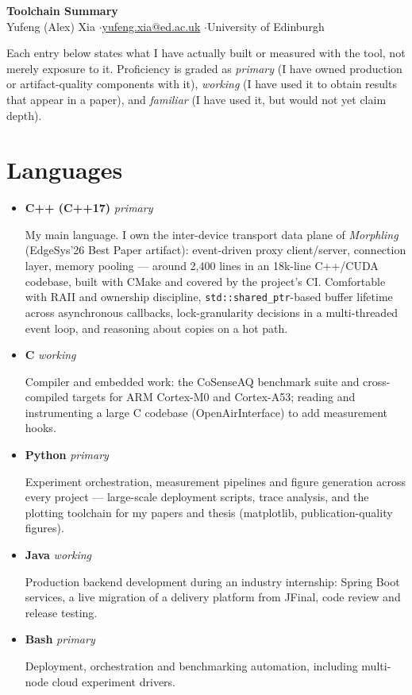 \documentclass[letterpaper,11pt]{article}
\newcommand{\tool}[3]{%
  \item\small{\textbf{#1} \hfill \textit{\footnotesize #2}\par\vspace{1pt}#3\vspace{2pt}}
}
\begin{document}
\begin{center}
  {\Large\textbf{Toolchain Summary}}\\[2pt]
  {\small Yufeng (Alex) Xia \quad$\cdot$\quad \href{mailto:yufeng.xia@ed.ac.uk}{yufeng.xia@ed.ac.uk} \quad$\cdot$\quad University of Edinburgh}
\end{center}

\vspace{4pt}

{\small Each entry below states what I have actually built or measured with the tool, not merely exposure to it. Proficiency is graded as
\textit{primary} (I have owned production or artifact-quality components with it),
\textit{working} (I have used it to obtain results that appear in a paper), and
\textit{familiar} (I have used it, but would not yet claim depth).}

\vspace{2pt}

\section{Languages}
  \begin{itemize}[leftmargin=*]
    \tool{C++ (C++17)}{primary}
      {My main language. I own the inter-device transport data plane of \textit{Morphling} (EdgeSys'26 Best Paper artifact): event-driven proxy client/server, connection layer, memory pooling --- around 2{,}400 lines in an 18k-line C++/CUDA codebase, built with CMake and covered by the project's CI. Comfortable with RAII and ownership discipline, \texttt{std::shared\_ptr}-based buffer lifetime across asynchronous callbacks, lock-granularity decisions in a multi-threaded event loop, and reasoning about copies on a hot path.}
    \tool{C}{working}
      {Compiler and embedded work: the CoSenseAQ benchmark suite and cross-compiled targets for ARM Cortex-M0 and Cortex-A53; reading and instrumenting a large C codebase (OpenAirInterface) to add measurement hooks.}
    \tool{Python}{primary}
      {Experiment orchestration, measurement pipelines and figure generation across every project --- large-scale deployment scripts, trace analysis, and the plotting toolchain for my papers and thesis (matplotlib, publication-quality figures).}
    \tool{Java}{working}
      {Production backend development during an industry internship: Spring Boot services, a live migration of a delivery platform from JFinal, code review and release testing.}
    \tool{Bash}{primary}
      {Deployment, orchestration and benchmarking automation, including multi-node cloud experiment drivers.}
  \end{itemize}
\end{document}
